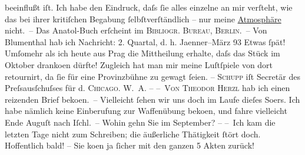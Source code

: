 \begin{ledgroupsized}[t]{13cm}
                    beeinflußt iſt. Ich habe den Eindruck, daſs ſie alles einzelne an mir verſteht,
                    wie das bei ihrer kritiſchen {\pb}Begabung
                    ſelbſtverſtändlich – nur meine \uline{Atmosphäre}
                    nicht. –\pend
           \pstart
           Das Anatol-Buch erſcheint im \textsc{Bibliogr. Bureau, Berlin}. –\pend
           \pstart
           Von Blumenthal hab ich Nachricht: 2. Quartal,
                    d. h. Jaenner–März 93 Etwas ſpät! Umſomehr als ich
                    heute aus Prag die Mittheilung erhalte, daſs
                    das Stück im Oktober dranko{\geminationm}en dürfte! Zugleich hat man mir meine Luſtſpiele
                    von dort retournirt, da ſie für eine Provinzbühne zu gewagt ſeien.\pend
           \pstart
           {\pb}– \textsc{Schupp} iſt Secretär des Preſsausſchuſses für d. \textsc{Chicago. W. A.} –\pend
           \pstart
           – \textsc{Von Theodor Herzl} hab ich einen reizenden Brief beko{\geminationm}en. –\pend
           \pstart
           Vielleicht ſehen wir uns doch im Laufe dieſes So{\geminationm}ers. Ich habe nämlich keine Einberufung zur Waffenübung beko{\geminationm}en, und fahre vielleicht Ende Auguſt
                    nach Iſchl. – Wohin gehn Sie im
                        September? –\pend
           \pstart
           – Ich kam die letzten Tage nicht zum Schreiben; die äußerliche Thätigkeit ſtört
                    doch. Hoffentlich bald! – Sie {\pb}ko{\geminationm}en ja ſicher mit den ganzen 5 Akten zurück!

\end{ledgroupsized}
